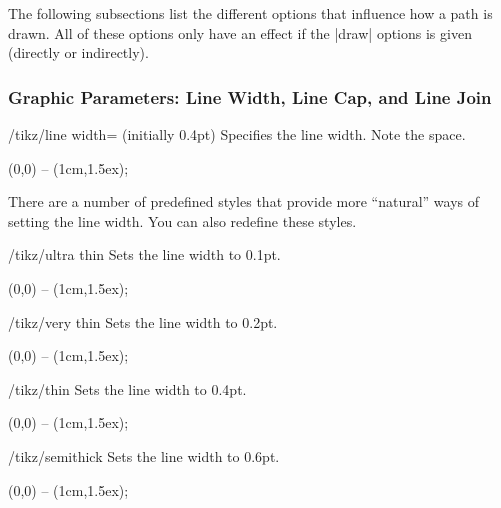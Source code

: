 The following subsections list the different options that influence
how a path is drawn. All of these options only have an effect if the
|draw| options is given (directly or indirectly).

\subsubsection{Graphic Parameters: Line Width, Line Cap, and Line Join}

\label{section-cap-joins}

\begin{key}{/tikz/line width= (initially 0.4pt)}
  Specifies the line width. Note the space.

\begin{codeexample}[]
  \tikz \draw[line width=5pt] (0,0) -- (1cm,1.5ex);
\end{codeexample}
\end{key}

There are a number of predefined styles that provide more ``natural''
ways of setting the line width. You can also redefine these
styles. 

\begin{stylekey}{/tikz/ultra thin}
  Sets the line width to 0.1pt.
\begin{codeexample}[]
  \tikz {} (0,0) -- (1cm,1.5ex);
\end{codeexample}
\end{stylekey}

\begin{stylekey}{/tikz/very thin}
  Sets the line width to 0.2pt.
\begin{codeexample}[]
  \tikz {} (0,0) -- (1cm,1.5ex);
\end{codeexample}
\end{stylekey}

\begin{stylekey}{/tikz/thin}
  Sets the line width to 0.4pt.
\begin{codeexample}[]
  \tikz \draw[thin] (0,0) -- (1cm,1.5ex);
\end{codeexample}
\end{stylekey}

\begin{stylekey}{/tikz/semithick}
  Sets the line width to 0.6pt.
\begin{codeexample}[]
  \tikz \draw[semithick] (0,0) -- (1cm,1.5ex);
\end{codeexample}
\end{stylekey}

